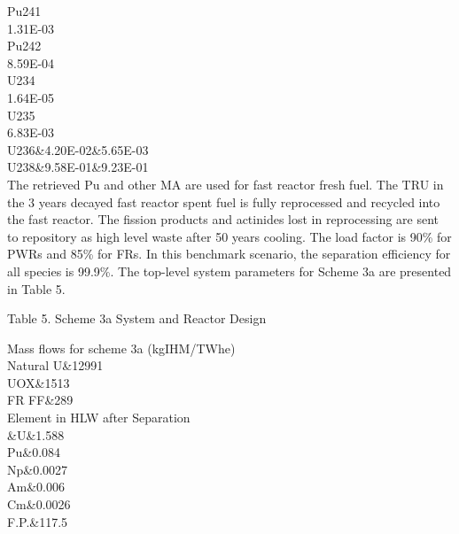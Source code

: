 Pu241\\

1.31E-03\\

Pu242\\

8.59E-04\\

U234\\

1.64E-05\\

U235\\

6.83E-03\\

U236&4.20E-02&5.65E-03\\

U238&9.58E-01&9.23E-01\\



The retrieved Pu and other MA are used for fast reactor fresh fuel. The
TRU in the 3 years decayed fast reactor spent fuel is fully reprocessed
and recycled into the fast reactor. The fission products and actinides
lost in reprocessing are sent to repository as high level waste after 50
years cooling.  The load factor is 90\% for PWRs and 85\% for FRs.  In
this benchmark scenario, the separation efficiency for all species is
99.9\%.  The top-level system parameters for Scheme 3a are presented in
Table 5.

Table 5.  Scheme 3a System and Reactor Design

Mass flows for scheme 3a (kgIHM/TWhe)\\

Natural U&12991\\

UOX&1513\\

FR FF&289\\

Element in HLW after Separation\\

&U&1.588\\

Pu&0.084\\

Np&0.0027\\

Am&0.006\\

Cm&0.0026\\

F.P.&117.5\\

